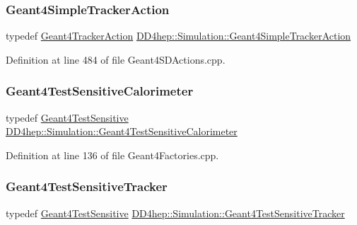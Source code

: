 \subsubsection{\texorpdfstring{Geant4\+Simple\+Tracker\+Action}{Geant4SimpleTrackerAction}}
{\footnotesize\ttfamily typedef \hyperlink{namespace_d_d4hep_1_1_simulation_abb17b973f2ae551abf2c7662d5c05e12}{Geant4\+Tracker\+Action} \hyperlink{namespace_d_d4hep_1_1_simulation_a6f4f8c57d8b3239f579f31519e803afa}{D\+D4hep\+::\+Simulation\+::\+Geant4\+Simple\+Tracker\+Action}}



Definition at line 484 of file Geant4\+S\+D\+Actions.\+cpp.

\hypertarget{namespace_d_d4hep_1_1_simulation_a67912331acd262c46253c23cbc346cf5}{}\label{namespace_d_d4hep_1_1_simulation_a67912331acd262c46253c23cbc346cf5} 
\subsubsection{\texorpdfstring{Geant4\+Test\+Sensitive\+Calorimeter}{Geant4TestSensitiveCalorimeter}}
{\footnotesize\ttfamily typedef \hyperlink{class_d_d4hep_1_1_simulation_1_1_test_1_1_geant4_test_sensitive}{Geant4\+Test\+Sensitive} \hyperlink{namespace_d_d4hep_1_1_simulation_a67912331acd262c46253c23cbc346cf5}{D\+D4hep\+::\+Simulation\+::\+Geant4\+Test\+Sensitive\+Calorimeter}}



Definition at line 136 of file Geant4\+Factories.\+cpp.

\hypertarget{namespace_d_d4hep_1_1_simulation_a6a20cbc2140f1f0da9332fe90fb80600}{}\label{namespace_d_d4hep_1_1_simulation_a6a20cbc2140f1f0da9332fe90fb80600} 
\subsubsection{\texorpdfstring{Geant4\+Test\+Sensitive\+Tracker}{Geant4TestSensitiveTracker}}
{\footnotesize\ttfamily typedef \hyperlink{class_d_d4hep_1_1_simulation_1_1_test_1_1_geant4_test_sensitive}{Geant4\+Test\+Sensitive} \hyperlink{namespace_d_d4hep_1_1_simulation_a6a20cbc2140f1f0da9332fe90fb80600}{D\+D4hep\+::\+Simulation\+::\+Geant4\+Test\+Sensitive\+Tracker}}



